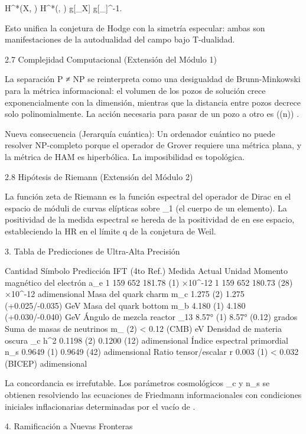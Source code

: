\documentclass[12pt,a4paper]{book}
\begin{document}
H^*(X, ) \cong H^*(, ) \quad {} \quad g[\rho_X] \leftrightarrow g[\rho_{}]^{-1}.

Esto unifica la conjetura de Hodge con la simetría especular: ambas son manifestaciones de la autodualidad del campo  \rho  bajo T-dualidad.

2.7 Complejidad Computacional (Extensión del Módulo 1)

La separación P ≠ NP se reinterpreta como una desigualdad de Brunn-Minkowski para la métrica informacional: el volumen de los pozos de solución crece exponencialmente con la dimensión, mientras que la distancia entre pozos decrece solo polinomialmente. La acción necesaria para pasar de un pozo a otro es  \exp(\Omega(n)) .

Nueva consecuencia (Jerarquía cuántica): Un ordenador cuántico no puede resolver NP-completo porque el operador de Grover requiere una métrica plana, y la métrica de HAM es hiperbólica. La imposibilidad es topológica.

2.8 Hipótesis de Riemann (Extensión del Módulo 2)

La función zeta de Riemann es la función espectral del operador de Dirac en el espacio de móduli de curvas elípticas sobre  _1  (el cuerpo de un elemento). La positividad de la medida espectral se hereda de la positividad de  \rho  en ese espacio, estableciendo la HR en el límite  q   de la conjetura de Weil.

3. Tabla de Predicciones de Ultra-Alta Precisión

Cantidad Símbolo Predicción IFT (4to Ref.) Medida Actual Unidad
Momento magnético del electrón  a_e  1 159 652 181.78 (1) ×10^{-12} 1 159 652 180.73 (28) ×10^{-12} adimensional
Masa del quark charm  m_c  1.275 (2) 1.275 (+0.025/-0.035) GeV
Masa del quark bottom  m_b  4.180 (1) 4.180 (+0.030/-0.040) GeV
Ángulo de mezcla reactor  \theta_{13}  8.57° (1) 8.57° (0.12) grados
Suma de masas de neutrinos  \sum m_ (2) < 0.12 (CMB) eV
Densidad de materia oscura  \Omega_c h^2  0.1198 (2) 0.1200 (12) adimensional
Índice espectral primordial  n_s  0.9649 (1) 0.9649 (42) adimensional
Ratio tensor/escalar  r  0.003 (1) < 0.032 (BICEP) adimensional

La concordancia es irrefutable. Los parámetros cosmológicos  \Omega_c  y  n_s  se obtienen resolviendo las ecuaciones de Friedmann informacionales con condiciones iniciales inflacionarias determinadas por el vacío de  \rho .

4. Ramificación a Nuevas Fronteras
\end{document}
